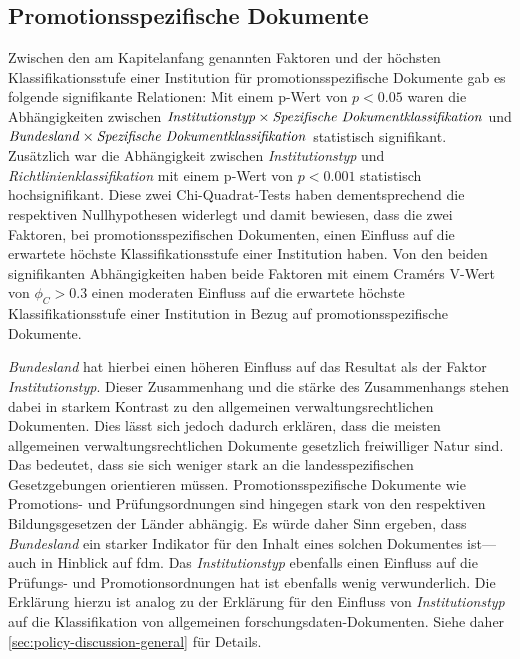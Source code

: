 \subsection{Promotionsspezifische Dokumente}\label{sec:policy-discussion-specific}
Zwischen den am Kapitelanfang genannten Faktoren und der höchsten Klassifikationsstufe einer Institution für promotionsspezifische Dokumente gab es folgende signifikante Relationen:
Mit einem p-Wert von $p<\num{0,05}$ waren die Abhängigkeiten zwischen $\text{\textit{Institutionstyp}}\times\text{\textit{Spezifische Dokumentklassifikation}}$ und $\text{\textit{Bundesland}}\times\text{\textit{Spezifische Dokumentklassifikation}}$ statistisch signifikant.
Zusätzlich war die Abhängigkeit zwischen \textit{Institutionstyp} und \textit{Richtlinienklassifikation} mit einem p-Wert von $p<\num{0,001}$ statistisch hochsignifikant.
Diese zwei Chi-Quadrat-Tests haben dementsprechend die respektiven Nullhypothesen widerlegt und damit bewiesen, dass die zwei Faktoren, bei promotionsspezifischen Dokumenten, einen Einfluss auf die erwartete höchste Klassifikationsstufe einer Institution haben.
Von den beiden signifikanten Abhängigkeiten haben beide Faktoren mit einem Cramérs V-Wert von $\phi_C>\num{0.3}$ einen moderaten Einfluss auf die erwartete höchste Klassifikationsstufe einer Institution in Bezug auf promotionsspezifische Dokumente.

\textit{Bundesland} hat hierbei einen höheren Einfluss auf das Resultat als der Faktor \textit{Institutionstyp}.
Dieser Zusammenhang und die stärke des Zusammenhangs stehen dabei in starkem Kontrast zu den allgemeinen verwaltungsrechtlichen Dokumenten.
Dies lässt sich jedoch dadurch erklären, dass die meisten allgemeinen verwaltungsrechtlichen Dokumente gesetzlich freiwilliger Natur sind.
Das bedeutet, dass sie sich weniger stark an die landesspezifischen Gesetzgebungen orientieren müssen.
Promotionsspezifische Dokumente wie Promotions- und Prüfungsordnungen sind hingegen stark von den respektiven Bildungsgesetzen der Länder abhängig.
Es würde daher Sinn ergeben, dass \textit{Bundesland} ein starker Indikator für den Inhalt eines solchen Dokumentes ist---auch in Hinblick auf \gls{fdm}.
Das \textit{Institutionstyp} ebenfalls einen Einfluss auf die Prüfungs- und Promotionsordnungen hat ist ebenfalls wenig verwunderlich.
Die Erklärung hierzu ist analog zu der Erklärung für den Einfluss von \textit{Institutionstyp} auf die Klassifikation von allgemeinen \gls{forschungsdaten}-Dokumenten.
Siehe daher \cref{sec:policy-discussion-general} für Details.

